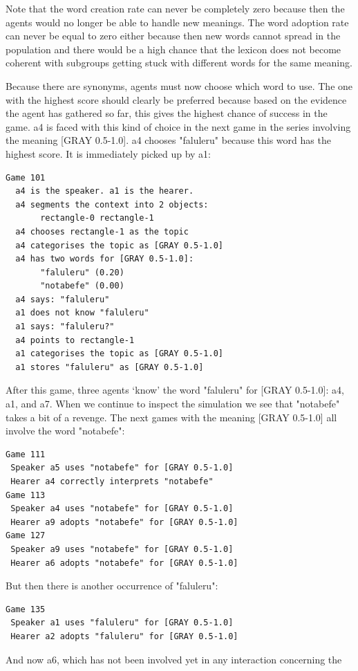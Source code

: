 Note that the word creation 
rate can never be completely zero because then the agents
would no longer be able to handle new meanings. The word 
adoption rate can never be equal to zero either because then 
new words cannot spread in the population and there
would be a high chance that the lexicon does not become coherent
with subgroups getting stuck with different
words for the same meaning. 

Because there are synonyms, agents must now choose
which word to use. The one with the highest
score should clearly be preferred because based on the
evidence the agent has gathered so far, this
gives the highest chance of success in the game. {\bfshape  a4}
is faced with this kind of choice in 
the next game in the series involving the meaning
{}[GRAY 0.5-1.0]. {\bfshape  a4} chooses "faluleru" because this 
word has the highest score. It is immediately picked up by 
{\bfshape  a1}: 
\begin{verbatim}
Game 101
  a4 is the speaker. a1 is the hearer. 
  a4 segments the context into 2 objects: 
       rectangle-0 rectangle-1
  a4 chooses rectangle-1 as the topic 
  a4 categorises the topic as [GRAY 0.5-1.0]
  a4 has two words for [GRAY 0.5-1.0]:
       "faluleru" (0.20)
       "notabefe" (0.00)
  a4 says: "faluleru"
  a1 does not know "faluleru"
  a1 says: "faluleru?"
  a4 points to rectangle-1
  a1 categorises the topic as [GRAY 0.5-1.0]
  a1 stores "faluleru" as [GRAY 0.5-1.0]
\end{verbatim}
After this game, three agents `know' the word 
"faluleru" for [GRAY 0.5-1.0]: {\bfshape  a4}, {\bfshape  a1}, 
and {\bfshape  a7}. When we continue to inspect the
simulation we see that "notabefe" takes a bit of 
a revenge. The next games with the 
meaning [GRAY 0.5-1.0] all involve the word "notabefe": 
\begin{verbatim}
Game 111
 Speaker a5 uses "notabefe" for [GRAY 0.5-1.0]
 Hearer a4 correctly interprets "notabefe"
Game 113
 Speaker a4 uses "notabefe" for [GRAY 0.5-1.0]
 Hearer a9 adopts "notabefe" for [GRAY 0.5-1.0]
Game 127
 Speaker a9 uses "notabefe" for [GRAY 0.5-1.0]
 Hearer a6 adopts "notabefe" for [GRAY 0.5-1.0]
\end{verbatim}
But then there is another occurrence of "faluleru": 
\begin{verbatim}
Game 135 
 Speaker a1 uses "faluleru" for [GRAY 0.5-1.0]
 Hearer a2 adopts "faluleru" for [GRAY 0.5-1.0]
\end{verbatim}
And now {\bfshape  a6}, which has not been involved 
yet in any interaction concerning the 
